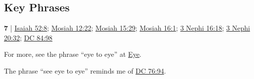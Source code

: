 		
\subsection{Key Phrases} %
	\label{SEE-PHRASES}

	\begin{compactdesc}
		\item[see eye to eye] \textbf{7} | \hyperref[ISAIAH-52-8]{Isaiah 52:8}; \hyperref[MOSIAH-12-22]{Mosiah 12:22}; \hyperref[MOSIAH-15-29]{Mosiah 15:29}; \hyperref[MOSIAH-16-1]{Mosiah 16:1}; \hyperref[3NEPHI-16-18]{3 Nephi 16:18}; \hyperref[3NEPHI-20-32]{3 Nephi 20:32}; \hyperref[DC84-98]{DC 84:98}
			\begin{compactdesc}
				\item[Bible anchor verses] \phantom{.}
					\begin{compactdesc}
						\item[Isaiah 52:8] 
					\end{compactdesc}
				\item[Commentary] For more, see the phrase ``eye to eye'' at \hyperref[EYE-PHRASES]{Eye}.
				\item The phrase ``see eye to eye'' reminds me of \hyperref[DC76-94]{DC 76:94}.
			\end{compactdesc}
	\end{compactdesc}
	


	
